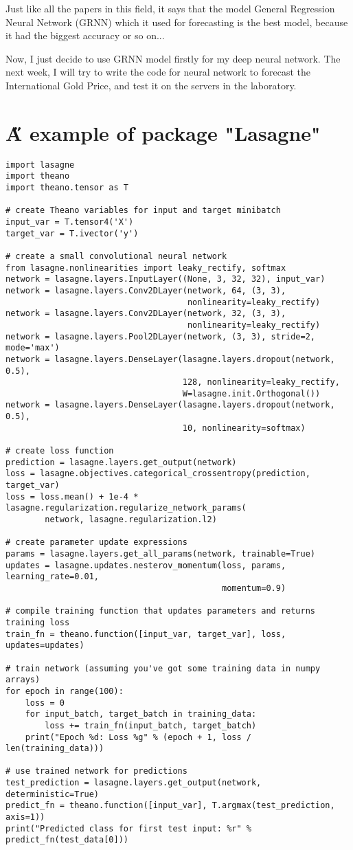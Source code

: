 \documentclass[12pt]{article}
\begin{document}
Just like all the papers in this field, it says that the model General Regression Neural Network (GRNN) which it used for forecasting is the best model, because it had the biggest accuracy or so on...

Now, I just decide to use GRNN model firstly for my deep neural network. The next week, I will try to write the code for neural network to forecast the International Gold Price, and test it on the servers in the laboratory.

\section{\H A example of package "Lasagne"}
\begin{lstlisting}
import lasagne
import theano
import theano.tensor as T

# create Theano variables for input and target minibatch
input_var = T.tensor4('X')
target_var = T.ivector('y')

# create a small convolutional neural network
from lasagne.nonlinearities import leaky_rectify, softmax
network = lasagne.layers.InputLayer((None, 3, 32, 32), input_var)
network = lasagne.layers.Conv2DLayer(network, 64, (3, 3),
                                     nonlinearity=leaky_rectify)
network = lasagne.layers.Conv2DLayer(network, 32, (3, 3),
                                     nonlinearity=leaky_rectify)
network = lasagne.layers.Pool2DLayer(network, (3, 3), stride=2, mode='max')
network = lasagne.layers.DenseLayer(lasagne.layers.dropout(network, 0.5),
                                    128, nonlinearity=leaky_rectify,
                                    W=lasagne.init.Orthogonal())
network = lasagne.layers.DenseLayer(lasagne.layers.dropout(network, 0.5),
                                    10, nonlinearity=softmax)

# create loss function
prediction = lasagne.layers.get_output(network)
loss = lasagne.objectives.categorical_crossentropy(prediction, target_var)
loss = loss.mean() + 1e-4 * lasagne.regularization.regularize_network_params(
        network, lasagne.regularization.l2)

# create parameter update expressions
params = lasagne.layers.get_all_params(network, trainable=True)
updates = lasagne.updates.nesterov_momentum(loss, params, learning_rate=0.01,
                                            momentum=0.9)

# compile training function that updates parameters and returns training loss
train_fn = theano.function([input_var, target_var], loss, updates=updates)

# train network (assuming you've got some training data in numpy arrays)
for epoch in range(100):
    loss = 0
    for input_batch, target_batch in training_data:
        loss += train_fn(input_batch, target_batch)
    print("Epoch %d: Loss %g" % (epoch + 1, loss / len(training_data)))

# use trained network for predictions
test_prediction = lasagne.layers.get_output(network, deterministic=True)
predict_fn = theano.function([input_var], T.argmax(test_prediction, axis=1))
print("Predicted class for first test input: %r" % predict_fn(test_data[0]))
\end{lstlisting}





\end{document}
